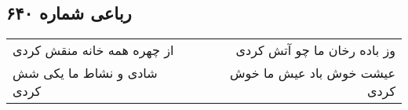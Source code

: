 \begin{center}
\section*{رباعی شماره ۶۴۰}
\label{sec:sh640}
\begin{longtable}{l p{0.5cm} r}
از چهره همه خانه منقش کردی
&&
وز باده رخان ما چو آتش کردی
\\
شادی و نشاط ما یکی شش کردی
&&
عیشت خوش باد عیش ما خوش کردی
\\
\end{longtable}
\end{center}
